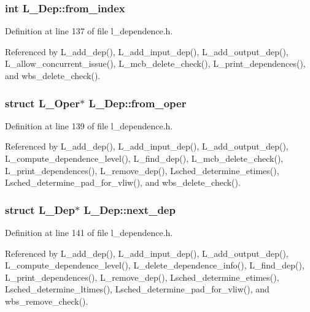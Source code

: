 \subsubsection{\setlength{\rightskip}{0pt plus 5cm}int \bf{L\_\-Dep::from\_\-index}}\label{structL__Dep_ed792e7cfe402fab33a16f86e9f4852d}




Definition at line 137 of file l\_\-dependence.h.

Referenced by L\_\-add\_\-dep(), L\_\-add\_\-input\_\-dep(), L\_\-add\_\-output\_\-dep(), L\_\-allow\_\-concurrent\_\-issue(), L\_\-mcb\_\-delete\_\-check(), L\_\-print\_\-dependences(), and wbs\_\-delete\_\-check().
\subsubsection{\setlength{\rightskip}{0pt plus 5cm}struct L\_\-Oper$\ast$ \bf{L\_\-Dep::from\_\-oper}}\label{structL__Dep_9a5be23d0afbd0c502bff914e109051d}




Definition at line 139 of file l\_\-dependence.h.

Referenced by L\_\-add\_\-dep(), L\_\-add\_\-input\_\-dep(), L\_\-add\_\-output\_\-dep(), L\_\-compute\_\-dependence\_\-level(), L\_\-find\_\-dep(), L\_\-mcb\_\-delete\_\-check(), L\_\-print\_\-dependences(), L\_\-remove\_\-dep(), Lsched\_\-determine\_\-etimes(), Lsched\_\-determine\_\-pad\_\-for\_\-vliw(), and wbs\_\-delete\_\-check().
\subsubsection{\setlength{\rightskip}{0pt plus 5cm}struct \bf{L\_\-Dep}$\ast$ \bf{L\_\-Dep::next\_\-dep}}\label{structL__Dep_0caaaa0a6e7173a84236f3a199abaade}




Definition at line 141 of file l\_\-dependence.h.

Referenced by L\_\-add\_\-dep(), L\_\-add\_\-input\_\-dep(), L\_\-add\_\-output\_\-dep(), L\_\-compute\_\-dependence\_\-level(), L\_\-delete\_\-dependence\_\-info(), L\_\-find\_\-dep(), L\_\-print\_\-dependences(), L\_\-remove\_\-dep(), Lsched\_\-determine\_\-etimes(), Lsched\_\-determine\_\-ltimes(), Lsched\_\-determine\_\-pad\_\-for\_\-vliw(), and wbs\_\-remove\_\-check().
